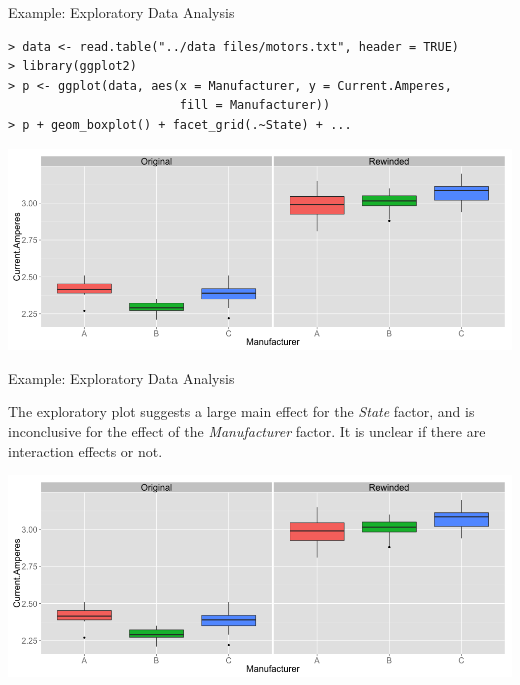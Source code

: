 \begin{frame}[fragile]{Example: Exploratory Data Analysis}

  {\smaller
\begin{verbatim}
> data <- read.table("../data files/motors.txt", header = TRUE)
> library(ggplot2)
> p <- ggplot(data, aes(x = Manufacturer, y = Current.Amperes,
                        fill = Manufacturer))
> p + geom_boxplot() + facet_grid(.~State) + ...
\end{verbatim}
  }

  \includegraphics[width=.8\textwidth]{../img/motors_box1.png}
\end{frame}

\begin{frame}[fragile]{Example: Exploratory Data Analysis}

  The exploratory plot suggests a large main effect for the \emph{State} factor,
  and is inconclusive for the effect of the \emph{Manufacturer} factor. It is
  unclear if there are interaction effects or not.\bigskip

  \includegraphics[width=.8\textwidth]{../img/motors_box1.png}
\end{frame}

